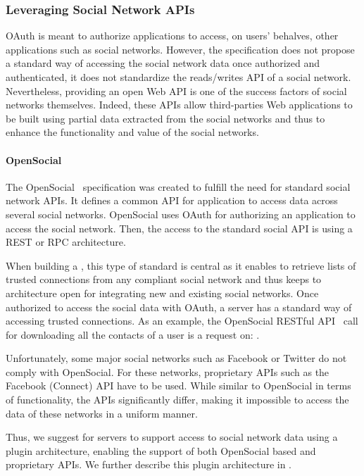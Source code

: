 \subsubsection{Leveraging Social Network APIs}
OAuth is meant to authorize applications to access, on users' behalves, other applications such as social networks. However, the specification does not propose a standard way of accessing the social network data once authorized and authenticated, it does not standardize the reads/writes API of a social network. Nevertheless, providing an open Web API is one of the success factors of social networks themselves. Indeed, these APIs allow third-parties Web applications to be built using partial data extracted from the social networks and thus to enhance the functionality and value of the social networks. 

\paragraph{OpenSocial}The OpenSocial~\cite{OpenSocial2010} specification was created to fulfill the need for standard social network APIs. It defines a common API for application to access data across several social networks. OpenSocial uses OAuth for authorizing an application to access the social network. Then, the access to the standard social API is using a REST or RPC architecture.

When building a \sacLong{}, this type of standard is central as it enables to retrieve lists of trusted connections from any compliant social network and thus keeps to architecture open for integrating new and existing social networks. Once authorized to access the social data with OAuth, a \sac{} server has a standard way of accessing trusted connections. As an example, the OpenSocial RESTful API~ call for downloading all the contacts of a user is a  request on: .

Unfortunately, some major social networks such as Facebook or Twitter do not comply with OpenSocial. For these networks, proprietary APIs such as the Facebook (Connect) API have to be used. While similar to OpenSocial in terms of functionality, the APIs significantly differ, making it impossible to access the data of these networks in a uniform manner.

Thus, we suggest for \sac{} servers to support access to social network data using a plugin architecture, enabling the support of both OpenSocial based and proprietary APIs. We further describe this plugin architecture in .

